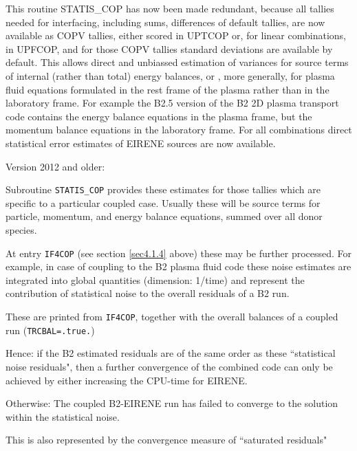 This routine STATIS\_COP has now been made redundant, because all tallies needed for interfacing, including sums, differences of
default tallies, are now available as COPV tallies, either scored in UPTCOP or, for linear combinations,  in UPFCOP,
and for those COPV tallies standard deviations are available by default. This allows direct
and unbiassed estimation of
variances for source terms of internal (rather than total) energy balances, or ,
more generally, for plasma fluid equations
formulated in the rest frame of the plasma rather than in the laboratory frame.
For example the B2.5 version of the B2
2D plasma transport code contains the energy balance equations in the plasma frame,
but the momentum balance equations
in the laboratory frame. For all combinations direct statistical error estimates of
EIRENE sources are now available.


\bigskip

Version 2012 and older:


Subroutine \verb|STATIS_COP| provides these estimates for those
tallies which are specific to a particular coupled case. Usually
these will be source terms for particle, momentum, and energy
balance equations, summed over all donor species.

At entry \texttt{IF4COP} (see section \ref{sec4.1.4} above) these
may be further processed. For example, in case of coupling to the
B2 plasma fluid code these noise estimates are integrated into
global quantities (dimension: 1/time) and represent the
contribution of statistical noise to the overall residuals of a B2
run.

These are printed from \texttt{IF4COP}, together with the overall
balances of a coupled run (\texttt{TRCBAL=.true.})

Hence: if the B2 estimated residuals are of the same order as
these ``statistical noise residuals", then a further convergence
of the combined code can only be achieved by either increasing the
CPU-time for EIRENE.

Otherwise: The coupled B2-EIRENE run has failed to converge to the
solution within the statistical noise.

This is also represented by the convergence measure of ``saturated
residuals"
\medskip

\newpage
